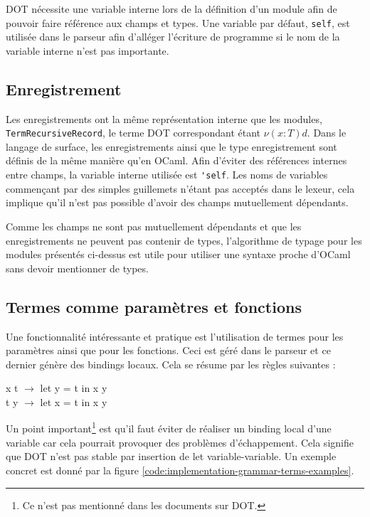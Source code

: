 DOT nécessite une variable interne lors de la définition d'un module afin de
pouvoir faire référence aux champs et types. Une variable par défaut,
\verb|self|, est utilisée dans le parseur afin d'alléger l'écriture de programme
si le nom de la variable interne n'est pas importante.

\subsection*{Enregistrement}

Les enregistrements ont la même représentation interne que les modules,
\verb|TermRecursiveRecord|, le terme DOT correspondant étant $\nu(x : T) d$.
Dans le langage de surface, les enregistrements ainsi que le type enregistrement
sont définis de la même manière qu'en OCaml. Afin d'éviter des références
internes entre champs, la variable interne utilisée est \verb|'self|. Les noms
de variables commençant par des simples guillemets n'étant pas acceptés dans le
lexeur, cela implique qu'il n'est pas possible d'avoir des champs mutuellement
dépendants.

Comme les champs ne sont pas mutuellement dépendants et que les enregistrements
ne peuvent pas contenir de types, l'algorithme de typage pour les modules
présentés ci-dessus est utile pour utiliser une syntaxe proche d'OCaml sans
devoir mentionner de types.

\subsection*{Termes comme paramètres et fonctions}

Une fonctionnalité intéressante et pratique est l'utilisation de
termes pour les paramètres ainsi que pour les fonctions. Ceci
est géré dans le parseur et ce dernier génère des bindings locaux. Cela se
résume par les règles suivantes :

\begin{center}
  x t $\rightarrow$ let y = t in x y \\
  t y $\rightarrow$ let x = t in x y
\end{center}

Un point important\footnote{Ce n'est pas mentionné dans les documents sur
DOT.} est qu'il faut éviter de réaliser un binding local d'une variable car
cela pourrait provoquer des problèmes d'échappement. Cela signifie que DOT n'est
pas stable par insertion de let variable-variable. Un exemple concret est donné
par la figure \ref{code:implementation-grammar-terms-examples}.


